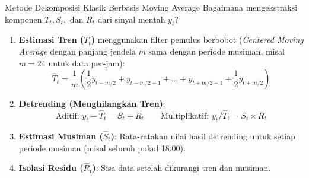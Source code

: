 \documentclass[aspectratio=169, 10pt]{beamer}
\begin{document}
\begin{frame}{Metode Dekomposisi Klasik Berbasis Moving Average}
    Bagaimana mengekstraksi komponen $T_t, S_t,$ dan $R_t$ dari sinyal mentah $y_t$?
    
    \begin{enumerate}
        \item \textbf{Estimasi Tren ($T_t$)} menggunakan filter pemulus berbobot (\textit{Centered Moving Average} dengan panjang jendela $m$ sama dengan periode musiman, misal $m=24$ untuk data per-jam):
        \begin{equation}
            \hat{T}_t = \frac{1}{m} \left( \frac{1}{2}y_{t-m/2} + y_{t-m/2+1} + \dots + y_{t+m/2-1} + \frac{1}{2}y_{t+m/2} \right)
        \end{equation}
        \item \textbf{Detrending (Menghilangkan Tren)}:
        \begin{equation}
            \text{Aditif: } y_t - \hat{T}_t = S_t + R_t \qquad \text{Multiplikatif: } y_t / \hat{T}_t = S_t \times R_t
        \end{equation}
        \item \textbf{Estimasi Musiman ($\hat{S}_t$)}: Rata-ratakan nilai hasil detrending untuk setiap periode musiman (misal seluruh pukul 18.00).
        \item \textbf{Isolasi Residu ($\hat{R}_t$)}: Sisa data setelah dikurangi tren dan musiman.
    \end{enumerate}
\end{frame}
\end{document}
